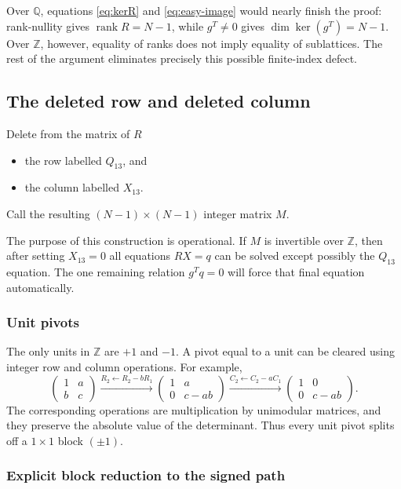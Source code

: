 \documentclass[11pt]{article}
\theoremstyle{definition}
\newcommand{\Z}{\mathbb Z}
\newcommand{\rank}{\operatorname{rank}}
\begin{document}
Over $\mathbb Q$, equations \eqref{eq:kerR} and \eqref{eq:easy-image} would nearly
finish the proof: rank-nullity gives $\rank R=N-1$, while $g^T\neq0$ gives
$\dim\ker(g^T)=N-1$.  Over $\Z$, however, equality of ranks does not imply
equality of sublattices.  The rest of the argument eliminates precisely this
possible finite-index defect.

\subsection{The deleted row and deleted column}

Delete from the matrix of $R$
\begin{itemize}[leftmargin=2em]
\item the row labelled $Q_{13}$, and
\item the column labelled $X_{13}$.
\end{itemize}
Call the resulting $(N-1)\times(N-1)$ integer matrix $M$.

The purpose of this construction is operational.  If $M$ is invertible over
$\Z$, then after setting $X_{13}=0$ all equations $RX=q$ can be solved except
possibly the $Q_{13}$ equation.  The one remaining relation $g^Tq=0$ will
force that final equation automatically.

\subsubsection{Unit pivots}

The only units in $\Z$ are $+1$ and $-1$.  A pivot equal to a unit can be
cleared using integer row and column operations.  For example,
\[
\begin{pmatrix}1&a\\ b&c\end{pmatrix}
\xrightarrow{R_2\leftarrow R_2-bR_1}
\begin{pmatrix}1&a\\0&c-ab\end{pmatrix}
\xrightarrow{C_2\leftarrow C_2-aC_1}
\begin{pmatrix}1&0\\0&c-ab\end{pmatrix}.
\]
The corresponding operations are multiplication by unimodular matrices, and
they preserve the absolute value of the determinant.  Thus every unit pivot
splits off a $1\times1$ block $(\pm1)$.

\subsubsection{Explicit block reduction to the signed path}
\end{document}

